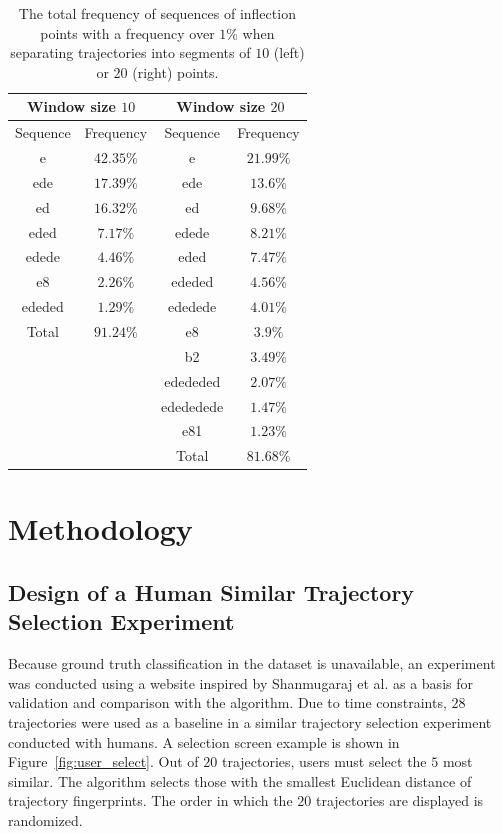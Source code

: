 \documentclass[preprint,12pt]{elsarticle}
\begin{document}
\begin{table}[!ht]
    \centering
    \begin{tabular}{|c|c|c|c|}
        \hline
        \multicolumn{2}{|c|}{Window size $10$} & \multicolumn{2}{c|}{Window size $20$} \\ \hline
        Sequence & Frequency & Sequence & Frequency \\ \hline
        e & $42.35\%$ & e & $21.99\%$ \\ \hline
        ede & $17.39\%$ & ede & $13.6\%$ \\ \hline
        ed & $16.32\%$ & ed & $9.68\%$ \\ \hline
        eded & $7.17\%$ & edede & $8.21\%$ \\ \hline
        edede & $4.46\%$ & eded & $7.47\%$ \\ \hline
        e8 & $2.26\%$ & ededed & $4.56\%$ \\ \hline
        ededed & $1.29\%$ & ededede & $4.01\%$ \\ \hline
        Total & $91.24\%$ & e8 & $3.9\%$ \\ \hline
        \multicolumn{2}{c|}{} & b2 & $3.49\%$ \\ \cline{3-4}
        \multicolumn{2}{c|}{} & edededed & $2.07\%$ \\ \cline{3-4}
        \multicolumn{2}{c|}{} & edededede & $1.47\%$ \\ \cline{3-4}
        \multicolumn{2}{c|}{} & e81 & $1.23\%$ \\ \cline{3-4}
        \multicolumn{2}{c|}{} & Total & $81.68\%$ \\ \cline{3-4}
    \end{tabular}
    \caption{The total frequency of sequences of inflection points with a frequency over $1\%$ when separating trajectories into segments of $10$ (left) or $20$ (right) points.}
    \label{tab:classes1020}
\end{table}

\section{Methodology}
\label{sec:Methodology}

\subsection{Design of a Human Similar Trajectory Selection Experiment}

Because ground truth classification in the dataset is unavailable, an experiment was conducted using a website inspired by Shanmugaraj et al. \citep{shanmugaraj2024smart} as a basis for validation and comparison with the algorithm. Due to time constraints, $28$ trajectories were used as a baseline in a similar trajectory selection experiment conducted with humans. A selection screen example is shown in Figure~\ref{fig:user_select}. Out of $20$ trajectories, users must select the $5$ most similar. The algorithm selects those with the smallest Euclidean distance of trajectory fingerprints. The order in which the $20$ trajectories are displayed is randomized.
\end{document}
